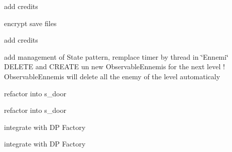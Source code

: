 \begin{DoxyRefList}
add credits 

encrypt save files 

add credits  
\item[\label{todo__todo000030}%
\hypertarget{todo__todo000030}{}%
Class \hyperlink{class_observables_ennemis}{Observables\+Ennemis} ]add management of State pattern, remplace timer by thread in \char`\"{}\+Ennemi\char`\"{}  D\+E\+L\+E\+T\+E and C\+R\+E\+A\+T\+E un new Observable\+Ennemis for the next level ! Observable\+Ennemis will delete all the enemy of the level automaticaly  
\item[\label{todo__todo000014}%
\hypertarget{todo__todo000014}{}%
Class \hyperlink{class_s___view_transition}{S\+\_\+\+View\+Transition} ]refactor into s\+\_\+door 

refactor into s\+\_\+door  
\item[\label{todo__todo000009}%
\hypertarget{todo__todo000009}{}%
Class \hyperlink{structslide_bloc}{slide\+Bloc} ]integrate with D\+P Factory 

integrate with D\+P Factory 
\end{DoxyRefList}